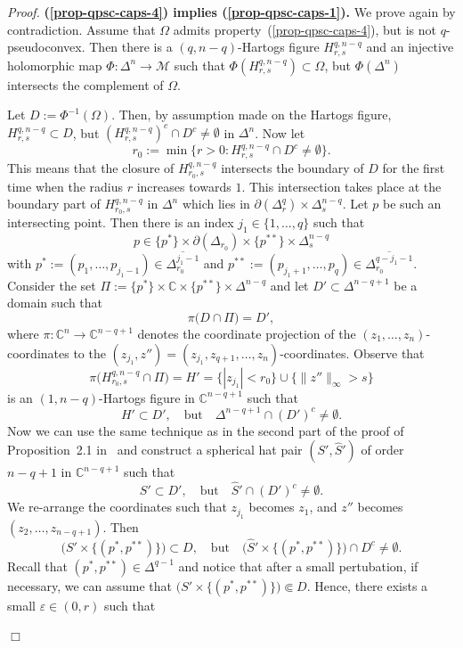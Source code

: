 \documentclass[11pt,a4paper]{article}
\newenvironment{proof}{\noindent\textit{Proof. }}{\hfill $\Box$\linebreak}
\newcommand{\CC}{\mathbb{C}}
\newcommand{\Mcal}{\mathcal{M}}
\newcommand{\eps}{\varepsilon}
\begin{document}
\begin{proof}
\textbf{(\ref{prop-qpsc-caps-4}) implies (\ref{prop-qpsc-caps-1}).} We prove again by contradiction. Assume that $\Omega$ admits property~(\ref{prop-qpsc-caps-4}), but is not $q$-pseudoconvex. Then there is a $(q,n-q)$-Hartogs figure $H^{q,n-q}_{r,s}$ and an injective holomorphic map $\Phi:\Delta^n \to \Mcal$ such that $\Phi(H^{q,n-q}_{r,s}) \subset \Omega$, but $\Phi(\Delta^n)$ intersects the complement of $\Omega$. %

Let $D:=\Phi^{-1}(\Omega)$. Then, by assumption made on the Hartogs figure, $H_{r,s}^{q,n-q} \subset D$, but $(H_{r,s}^{q,n-q})^c \cap D^c \neq \emptyset$ in $\Delta^n$. Now let 
\[
r_0 := \min \{ r>0 : H_{r,s}^{q,n-q} \cap D^c \neq \emptyset \}.
\]
This means that the closure of $H_{r_0,s}^{q,n-q}$ intersects the boundary of $D$ for the first time when the radius $r$ increases towards $1$. This intersection takes place at the boundary part of $H_{r_0,s}^{q,n-q}$ in $\Delta^n$ which lies in $\partial(\Delta^q_r) \times \Delta^{n-q}_s$. Let $p$ be such an intersecting point. Then there is an index $j_1 \in \{1,\ldots,q\}$ such that
\[
p \in \{p^*\}  \times \partial({\Delta}_{r_0}) \times \{p^{**}\} \times \Delta^{n-q}_s
\]
with $p^*:=(p_1,\ldots,p_{j_1-1}) \in \overline{\Delta^{{j_1}-1}_{r_0}}$ and  $p^{**}:=(p_{j_1+1},\ldots,p_{q}) \in \overline{\Delta^{q-{j_1}-1}_{r_0}}$. Consider the set $\Pi:=\{p^*\}\times \CC \times \{p^{**}\} \times \Delta^{n-q}$ and let $D' \subset \Delta^{n-q+1}$ be a domain such that 
\[
\pi\Big(D \cap \Pi \Big) = D',
\]
where $\pi:\CC^n \to \CC^{n-q+1}$ denotes the coordinate projection of the $(z_1,\ldots,z_n)$-coordinates to the $(z_{j_1},z'')=(z_{j_1},z_{q+1},\ldots,z_n)$-coordinates. Observe that
\[
\pi\big( H^{q,n-q}_{r_0,s} \cap \Pi \big) = H' = \{|z_{j_1}| < r_0\} \cup \{\|z''\|_\infty > s\}
\]
is an $(1,n-q)$-Hartogs figure in $\CC^{n-q+1}$ such that
\[
H' \subset D', \quad \text{but}\quad \Delta^{n-q+1} \cap (D')^c \neq \emptyset.
\] 
Now we can use the same technique as in the second part of the proof of Proposition~2.1 in~\cite{Shc21} and construct a spherical hat pair $(S',\hat S')$ of order $n-q+1$ in $\CC^{n-q+1}$ such that 
\[
S' \subset D', \quad \text{but}\quad \hat S' \cap (D')^c \neq \emptyset.
\]
We re-arrange the coordinates such that $z_{j_1}$ becomes $z_1$, and $z''$ becomes $(z_2,\ldots,z_{n-q+1})$. Then
\[
\big(S'\times\{(p^*, p^{**})\}\big) \subset D, \quad \text{but}\quad \big(\hat S'\times\{(p^*,p^{**})\}\big) \cap D^c \neq \emptyset.
\]
Recall that $(p^*,p^{**}) \in \Delta^{q-1}$ and notice that after a small pertubation, if necessary, we can assume that $\big(S'\times\{(p^*, p^{**})\}\big) \Subset D$. Hence, there exists a small $\eps \in (0,r)$ such that

\end{proof}
\end{document}
